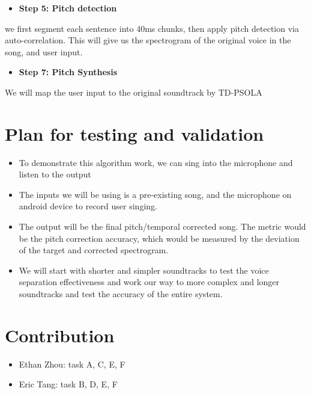 \documentclass[journal,onecolumn, draftclsnofoot, 12pt]{IEEEtran}
\begin{document}
\vspace{0.5cm}
\begin{itemize}
    \item \textbf{Step 5: Pitch detection} 
\end{itemize}
\begin{description}
   we first segment each sentence into 40ms chunks, then apply pitch detection via auto-correlation. This will give us the spectrogram of the original voice in the song, and user input.
\end{description}

\vspace{0.5cm}
\begin{itemize}
    \item \textbf{Step 7: Pitch Synthesis} 
\end{itemize}
\begin{description}
   We will map the user input to the original soundtrack by TD-PSOLA
\end{description}




\section{Plan for testing and validation}
\begin{itemize}
    \item To demonstrate this algorithm work, we can sing into the microphone and listen to the output
    \item The inputs we will be using is a pre-existing song, and the microphone on android device to record user singing. 
    \item The output will be the final pitch/temporal corrected song. The metric would be the pitch correction accuracy, which would be measured by the deviation of the target and corrected spectrogram.
    \item We will start with shorter and simpler soundtracks to test the voice separation effectiveness and work our way to more complex and longer soundtracks and test the accuracy of the entire system.
    
\end{itemize}

\section{Contribution}
\begin{itemize}
    \item Ethan Zhou: task A, C, E, F
    \item Eric Tang: task B, D, E, F
\end{itemize}
\end{document}
